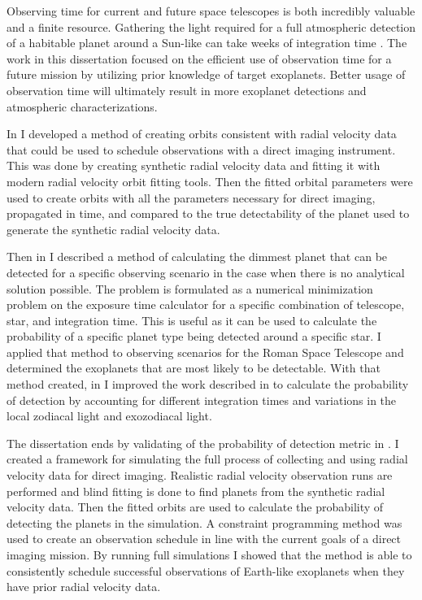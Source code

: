 Observing time for current and future space telescopes is both incredibly
valuable and a finite resource. Gathering the light required for a full
atmospheric detection of a habitable planet around a Sun-like can take weeks of
integration time \citep{TheLUVOIRTeam2019}. The work in this dissertation
focused on the efficient use of observation time for a future mission by
utilizing prior knowledge of target exoplanets. Better usage of observation
time will ultimately result in more exoplanet detections and atmospheric
characterizations.

In  I developed a method of creating orbits consistent
with radial velocity data that could be used to schedule observations with a
direct imaging instrument. This was done by creating synthetic radial velocity
data and fitting it with modern radial velocity orbit fitting tools. Then the
fitted orbital parameters were used to create orbits with all the parameters
necessary for direct imaging, propagated in time, and compared to the true
detectability of the planet used to generate the synthetic radial velocity data.

Then in  I described a method of calculating the dimmest
planet that can be detected for a specific observing scenario in the case when
there is no analytical solution possible. The problem is formulated as a
numerical minimization problem on the exposure time calculator for a specific
combination of telescope, star, and integration time. This is useful as it can
be used to calculate the probability of a specific planet type being detected
around a specific star. I applied that method to observing scenarios for the
Roman Space Telescope and determined the exoplanets that are most likely to be
detectable. With that method created, in  I improved
the work described in  to calculate the probability of
detection by accounting for different integration times and variations in the
local zodiacal light and exozodiacal light.

The dissertation ends by validating of the probability of detection metric in
. I created a framework for simulating the full
process of collecting and using radial velocity data for direct imaging.
Realistic radial velocity observation runs are performed and blind fitting is
done to find planets from the synthetic radial velocity data. Then the fitted
orbits are used to calculate the probability of detecting the planets in the
simulation. A constraint programming method was used to create an observation
schedule in line with the current goals of a direct imaging mission. By running
full simulations I showed that the method is able to consistently schedule
successful observations of Earth-like exoplanets when they have prior radial
velocity data.

